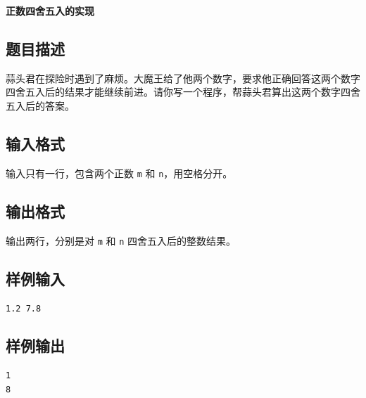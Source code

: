 \documentclass{article}
\newcommand{\problemname}[1]{\begin{center}\Large\bfseries #1\end{center}}
\begin{document}
\problemname{正数四舍五入的实现}

\subsection*{题目描述}
蒜头君在探险时遇到了麻烦。大魔王给了他两个数字，要求他正确回答这两个数字四舍五入后的结果才能继续前进。请你写一个程序，帮蒜头君算出这两个数字四舍五入后的答案。

\subsection*{输入格式}
输入只有一行，包含两个正数 \texttt{m} 和 \texttt{n}，用空格分开。

\subsection*{输出格式}
输出两行，分别是对 \texttt{m} 和 \texttt{n} 四舍五入后的整数结果。

\subsection*{样例输入}
\begin{verbatim}
1.2 7.8
\end{verbatim}

\subsection*{样例输出}
\begin{verbatim}
1
8
\end{verbatim}
\end{document}
